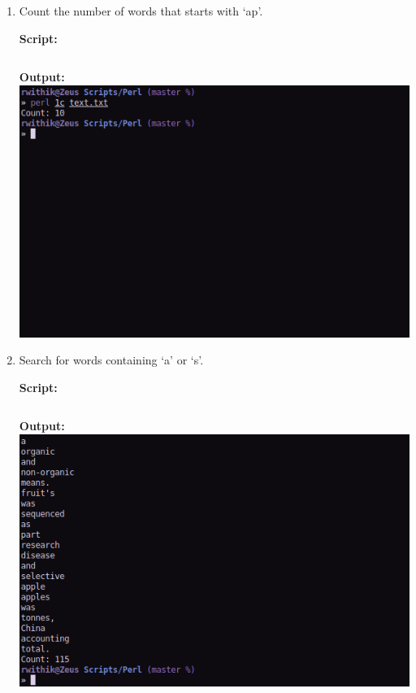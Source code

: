 \documentclass[10pt,a4paper,titlepage]{report}
\begin{document}
\begin{enumerate}
	\item Count the number of words that starts with `ap’.\newline
	\par
	\textbf{Script: }\newline
	\inputminted[tabsize=4]{perl}{../Scripts/Perl/1c}
	\pagebreak
	\textbf{Output: }\newline\newline
	\includegraphics[width=\linewidth]{../Images/Perl/1c.png}
	\item Search for words containing `a’ or `s’.\newline
	\par
	\textbf{Script: }\newline
	\inputminted[tabsize=4]{perl}{../Scripts/Perl/1d}
	\pagebreak
	\textbf{Output: }\newline\newline
	\includegraphics[width=\linewidth]{../Images/Perl/1d.png}

\end{enumerate}
\end{document}
